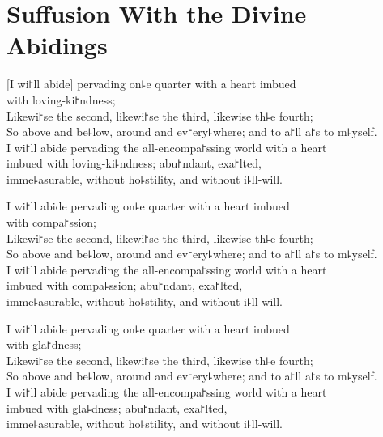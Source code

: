 \chapter[Divine Abidings]{Suffusion With the Divine Abidings}%


\begin{leader}
\end{leader}

[I wi꜓ll abide] pervading on꜕e quarter with a heart imbued\\
\vin with loving-ki꜓ndness;\\
Likewi꜓se the second, likewi꜓se the third, likewise th꜕e fourth;\\
So above and be꜕low, around and ev꜓ery꜕where; and to a꜓ll a꜓s to m꜕yself.\\
I wi꜓ll abide pervading the all-encompa꜓ssing world with a heart \\
\vin imbued with loving-ki꜕ndness; abu꜓ndant, exa꜓lted,\\
\vin imme꜕asurable, without ho꜕stility, and without i꜕ll-will.

I wi꜓ll abide pervading on꜕e quarter with a heart imbued\\
\vin with compa꜓ssion;\\
Likewi꜓se the second, likewi꜓se the third, likewise th꜕e fourth;\\
So above and be꜕low, around and ev꜓ery꜕where; and to a꜓ll a꜓s to m꜕yself.\\
I wi꜓ll abide pervading the all-encompa꜓ssing world with a heart \\
\vin imbued with compa꜕ssion; abu꜓ndant, exa꜓lted,\\
\vin imme꜕asurable, without ho꜕stility, and without i꜕ll-will.

I wi꜓ll abide pervading on꜕e quarter with a heart imbued\\
\vin with gla꜓dness;\\
Likewi꜓se the second, likewi꜓se the third, likewise th꜕e fourth;\\
So above and be꜕low, around and ev꜓ery꜕where; and to a꜓ll a꜓s to m꜕yself.\\
I wi꜓ll abide pervading the all-encompa꜓ssing world with a heart \\
\vin imbued with gla꜕dness; abu꜓ndant, exa꜓lted,\\
\vin imme꜕asurable, without ho꜕stility, and without i꜕ll-will.

